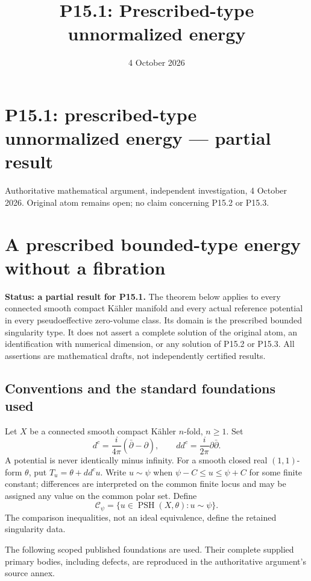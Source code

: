 \documentclass[
  11pt,
]{article}
\title{P15.1: Prescribed-type unnormalized energy}
\author{}
\date{4 October 2026}
\begin{document}
\maketitle

\section{P15.1: prescribed-type unnormalized energy --- partial
result}\label{p15.1-prescribed-type-unnormalized-energy-partial-result}

Authoritative mathematical argument, independent investigation, 4
October 2026. Original atom remains open; no claim concerning P15.2 or
P15.3.

\section{A prescribed bounded-type energy without a
fibration}\label{a-prescribed-bounded-type-energy-without-a-fibration}

\textbf{Status: a partial result for P15.1.} The theorem below applies
to every connected smooth compact Kähler manifold and every actual
reference potential in every pseudoeffective zero-volume class. Its
domain is the prescribed bounded singularity type. It does not assert a
complete solution of the original atom, an identification with numerical
dimension, or any solution of P15.2 or P15.3. All assertions are
mathematical drafts, not independently certified results.

\subsection{Conventions and the standard foundations
used}\label{conventions-and-the-standard-foundations-used}

Let \(X\) be a connected smooth compact Kähler \(n\)-fold, \(n\geq1\).
Set \[
d^c=\frac{i}{4\pi}(\bar\partial-\partial),\qquad dd^c=\frac{i}{2\pi}\partial\bar\partial.
\] A potential is never identically minus infinity. For a smooth closed
real \((1,1)\)-form \(\theta\), put \(T_u=\theta+dd^cu\). Write
\(u\sim\psi\) when \(\psi-C\leq u\leq\psi+C\) for some finite constant;
differences are interpreted on the common finite locus and may be
assigned any value on the common polar set. Define \[
\mathcal C_\psi=\{u\in\operatorname{PSH}(X,\theta):u\sim\psi\}.
\] The comparison inequalities, not an ideal equivalence, define the
retained singularity data.

The following scoped published foundations are used. Their complete
supplied primary bodies, including defects, are reproduced in the
authoritative argument's source annex.
\end{document}
